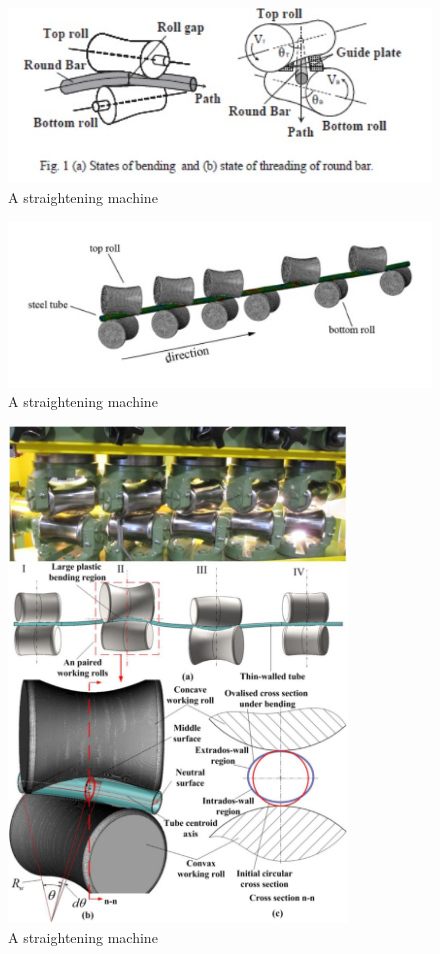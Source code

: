 \documentclass{article}
\begin{document}
\begin{figure}[H]
	\centering
	\includegraphics[]{straightening1.jpg}
	\caption{A straightening machine~\cite{kato2014straightening}}
	\label{straighteningImage1}
\end{figure}

\begin{figure}[H]
	\centering
	\includegraphics[]{straightening3.jpg}
	\caption{A straightening machine~\cite{ma2021analysis}}
	\label{straighteningImage3}
\end{figure}

\begin{figure}[H]
	\centering
	\includegraphics[width=90mm, keepaspectratio]{Straightening5.png}
	\caption{A straightening machine~\cite{zhang2019modeling}}
	\label{straighteningImage5}
\end{figure}
\end{document}

